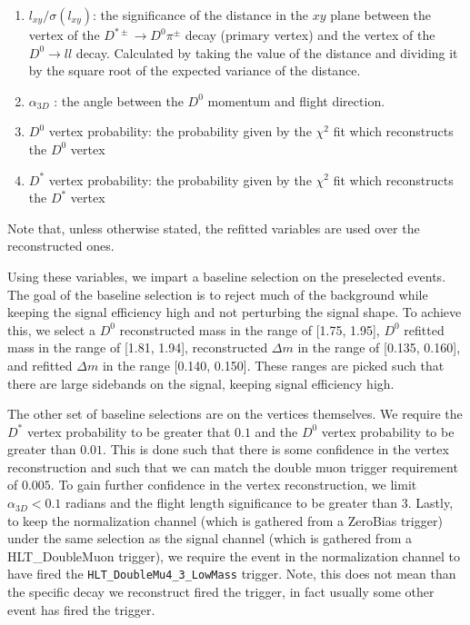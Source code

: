 \begin{enumerate}
    \item $l_{xy}/\sigma\left(l_{xy}\right)$: the significance of the distance in the $xy$ plane between the vertex of the $D^{*\pm} \to D^0 \pi^\pm$ decay (primary vertex) and the vertex of the $D^0 \to l l$ decay. Calculated by taking the value of the distance and dividing it by the square root of the expected variance of the distance. 
    \item $\alpha_{3D}$ : the angle between the $D^0$ momentum and flight direction. 
    \item $D^0$ vertex probability: the probability given by the $\chi^2$ fit which reconstructs the $D^0$ vertex 
    \item $D^*$ vertex probability: the probability given by the $\chi^2$ fit which reconstructs the $D^*$ vertex
\end{enumerate}
Note that, unless otherwise stated, the refitted variables are used over the reconstructed ones. 

Using these variables, we impart a baseline selection on the preselected events. The goal of the baseline selection is to reject much of the background while keeping the signal efficiency high and not perturbing the signal shape. To achieve this, we select a $D^0$ reconstructed mass in the range of [1.75, 1.95], $D^0$ refitted mass in the range of [1.81, 1.94], reconstructed $\Delta m$ in the range of [0.135, 0.160], and refitted $\Delta m$ in the range [0.140, 0.150]. These ranges are picked such that there are large sidebands on the signal, keeping signal efficiency high.

The other set of baseline selections are on the vertices themselves. We require the $D^*$ vertex probability to be greater that $0.1$ and the $D^0$ vertex probability to be greater than $0.01$. This is done such that there is some confidence in the vertex reconstruction and such that we can match the double muon trigger requirement of $0.005$. To gain further confidence in the vertex reconstruction, we limit $\alpha_{3D} < 0.1$ radians and the flight length significance to be greater than 3. Lastly, to keep the normalization channel (which is gathered from a ZeroBias trigger) under the same selection as the signal channel (which is gathered from a HLT\_DoubleMuon trigger), we require the event in the normalization channel to have fired the \texttt{HLT\_DoubleMu4\_3\_LowMass} trigger. Note, this does not mean than the specific decay we reconstruct fired the trigger, in fact usually some other event has fired the trigger. 

